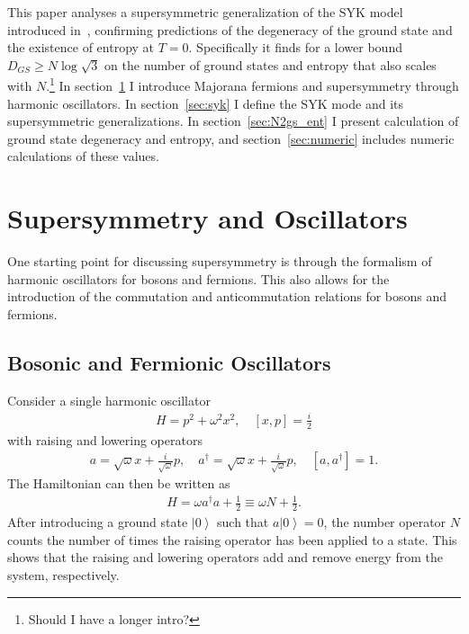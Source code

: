 \documentclass[12pt]{article} %
\renewcommand{\th}[1]{\frac{1}{#1}}
\newcommand{\om}{\omega}
\newcommand{\ket}[1]{\left|#1\right\rangle}
\newcommand{\comm}[2]{\left[#1,#2\right]}
\begin{document}
This paper analyses a supersymmetric generalization of the SYK model introduced in~\cite{fu16}, confirming predictions of the degeneracy of the ground state and the existence of entropy at $T=0$. Specifically it finds for a lower bound $D_{GS}\ge N\log\sqrt{3}$ on the number of ground states and entropy that also scales with $N$.\footnote{Should I have a longer intro?} In section~\ref{sec:osc} I introduce Majorana fermions and supersymmetry through harmonic oscillators. In section~\ref{sec:syk} I define the SYK mode and its supersymmetric generalizations. In section~\ref{sec:N2gs_ent} I present calculation of ground state degeneracy and entropy, and section~\ref{sec:numeric} includes numeric calculations of these values.


\section{Supersymmetry and Oscillators} \label{sec:osc}

One starting point for discussing supersymmetry is through the formalism of harmonic oscillators for bosons and fermions. This also allows for the introduction of the commutation and anticommutation relations for bosons and fermions.

\subsection{Bosonic and Fermionic Oscillators} \emph{} \label{sub:bf_osc}

Consider a single harmonic oscillator 
\begin{align}
H = p^2 +\om^2 x^2,\quad \comm{x}{p} = \frac{i}{2} \label{eqn:harmosc}
\end{align}
with raising and lowering operators
\begin{align}
a = \sqrt{\om}x+\frac{i}{\sqrt{\om}}p,\quad a^\dag = \sqrt{\om}x+\frac{i}{
	\sqrt{\om}}p,\quad \comm{a}{a^\dag } = 1.
\end{align}
The Hamiltonian can then be written as 
\begin{align}
H = \om a^\dag a + \th{2} \equiv \om N + \th{2}.
\end{align}
After introducing a ground state $\ket{0}$ such that $a\ket{0} = 0$, the number operator $N$ counts the number of times the raising operator has been applied to a state. This shows that the raising and lowering operators add and remove energy from the system, respectively. 
\end{document}
